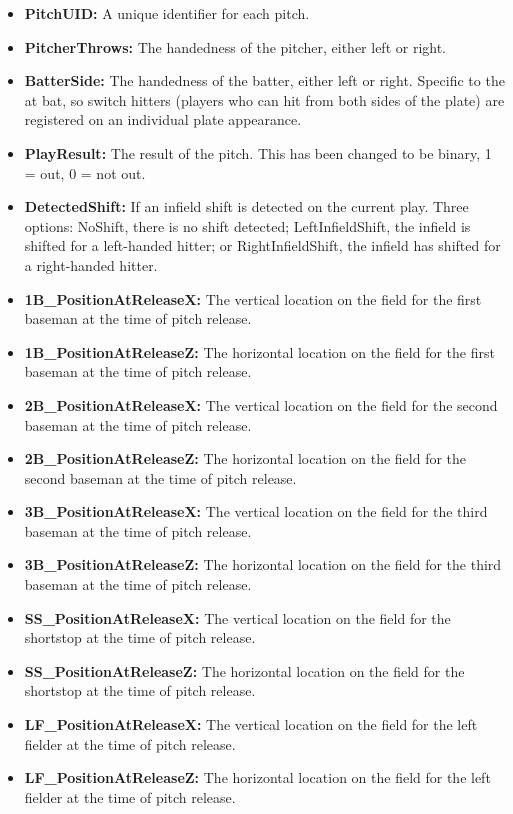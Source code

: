 \documentclass{article}
\begin{document}
\begin{itemize}
    \item \textbf{PitchUID:} A unique identifier for each pitch. 
    \item \textbf{PitcherThrows:} The handedness of the pitcher, either left or right.
    \item \textbf{BatterSide:} The handedness of the batter, either left or right. Specific to the at bat, so switch hitters (players who can hit from both sides of the plate) are registered on an individual plate appearance.
    \item \textbf{PlayResult:} The result of the pitch. This has been changed to be binary, 1 = out, 0 = not out.
    \item \textbf{DetectedShift:} If an infield shift is detected on the current play. Three options: NoShift, there is no shift detected; LeftInfieldShift, the infield is shifted for a left-handed hitter; or RightInfieldShift, the infield has shifted for a right-handed hitter.
    \item \textbf{1B\_PositionAtReleaseX:} The vertical location on the field for the first baseman at the time of pitch release.
    \item \textbf{1B\_PositionAtReleaseZ:} The horizontal location on the field for the first baseman at the time of pitch release.
    \item \textbf{2B\_PositionAtReleaseX:} The vertical location on the field for the second baseman at the time of pitch release.
    \item \textbf{2B\_PositionAtReleaseZ:} The horizontal location on the field for the second baseman at the time of pitch release.
    \item \textbf{3B\_PositionAtReleaseX:} The vertical location on the field for the third baseman at the time of pitch release.
    \item \textbf{3B\_PositionAtReleaseZ:} The horizontal location on the field for the third baseman at the time of pitch release.
    \item \textbf{SS\_PositionAtReleaseX:} The vertical location on the field for the shortstop at the time of pitch release.
    \item \textbf{SS\_PositionAtReleaseZ:} The horizontal location on the field for the shortstop at the time of pitch release.
    \item \textbf{LF\_PositionAtReleaseX:} The vertical location on the field for the left fielder at the time of pitch release.
    \item \textbf{LF\_PositionAtReleaseZ:} The horizontal location on the field for the left fielder at the time of pitch release.

\end{itemize}
\end{document}
